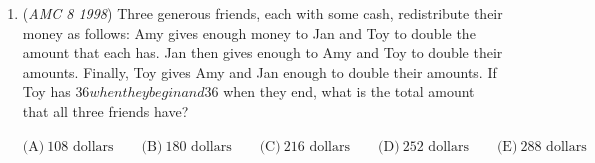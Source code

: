 \begin{enumerate}
	\item (\textit{AMC 8 1998}) Three generous friends, each with some cash, redistribute their money as follows: Amy gives enough money to Jan and Toy to double the amount that each has.  Jan then gives enough to Amy and Toy to double their amounts.  Finally, Toy gives Amy and Jan enough to double their amounts.  If Toy has $36 when they begin and $36 when they end, what is the total amount that all three friends have?


 $\text{(A)}\ 108\text{ dollars} \qquad \text{(B)}\ 180\text{ dollars} \qquad \text{(C)}\ 216\text{ dollars} \qquad \text{(D)}\ 252\text{ dollars} \qquad \text{(E)}\ 288\text{ dollars}$


\end{enumerate}